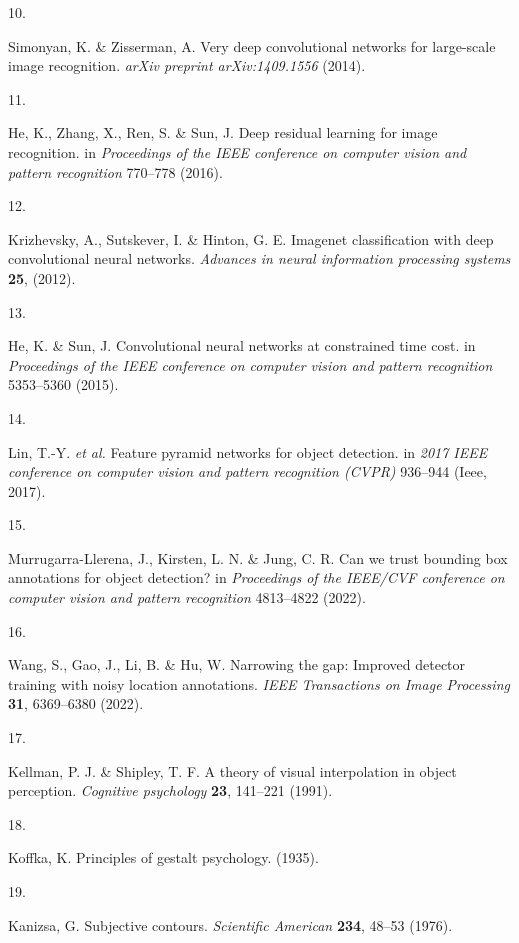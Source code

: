 \documentclass[
  letterpaper,
  DIV=11,
  numbers=noendperiod]{scrartcl}
\newlength{\cslhangindent}
\newlength{\csllabelwidth}
\newenvironment{CSLReferences}[2] %
 {\begin{list}{}{%
  \setlength{\itemindent}{0pt}
  \setlength{\leftmargin}{0pt}
  \setlength{\parsep}{0pt}
  \ifodd #1
   \setlength{\leftmargin}{\cslhangindent}
   \setlength{\itemindent}{-1\cslhangindent}
  \fi
  \setlength{\itemsep}{#2\baselineskip}}}
 {\end{list}}
\newcommand{\CSLLeftMargin}[1]{\parbox[t]{\csllabelwidth}{\strut#1\strut}}
\newcommand{\CSLRightInline}[1]{\parbox[t]{\linewidth - \csllabelwidth}{\strut#1\strut}}
\begin{document}
\begin{CSLReferences}{0}{0}
\CSLLeftMargin{10. }%
\CSLRightInline{Simonyan, K. \& Zisserman, A. Very deep convolutional
networks for large-scale image recognition. \emph{arXiv preprint
arXiv:1409.1556} (2014).}

\CSLLeftMargin{11. }%
\CSLRightInline{He, K., Zhang, X., Ren, S. \& Sun, J. Deep residual
learning for image recognition. in \emph{Proceedings of the IEEE
conference on computer vision and pattern recognition} 770--778 (2016).}

\CSLLeftMargin{12. }%
\CSLRightInline{Krizhevsky, A., Sutskever, I. \& Hinton, G. E. Imagenet
classification with deep convolutional neural networks. \emph{Advances
in neural information processing systems} \textbf{25}, (2012).}

\CSLLeftMargin{13. }%
\CSLRightInline{He, K. \& Sun, J. Convolutional neural networks at
constrained time cost. in \emph{Proceedings of the IEEE conference on
computer vision and pattern recognition} 5353--5360 (2015).}

\CSLLeftMargin{14. }%
\CSLRightInline{Lin, T.-Y. \emph{et al.} Feature pyramid networks for
object detection. in \emph{2017 IEEE conference on computer vision and
pattern recognition (CVPR)} 936--944 (Ieee, 2017).}

\CSLLeftMargin{15. }%
\CSLRightInline{Murrugarra-Llerena, J., Kirsten, L. N. \& Jung, C. R.
Can we trust bounding box annotations for object detection? in
\emph{Proceedings of the IEEE/CVF conference on computer vision and
pattern recognition} 4813--4822 (2022).}

\CSLLeftMargin{16. }%
\CSLRightInline{Wang, S., Gao, J., Li, B. \& Hu, W. Narrowing the gap:
Improved detector training with noisy location annotations. \emph{IEEE
Transactions on Image Processing} \textbf{31}, 6369--6380 (2022).}

\CSLLeftMargin{17. }%
\CSLRightInline{Kellman, P. J. \& Shipley, T. F. A theory of visual
interpolation in object perception. \emph{Cognitive psychology}
\textbf{23}, 141--221 (1991).}

\CSLLeftMargin{18. }%
\CSLRightInline{Koffka, K. Principles of gestalt psychology. (1935).}

\CSLLeftMargin{19. }%
\CSLRightInline{Kanizsa, G. Subjective contours. \emph{Scientific
American} \textbf{234}, 48--53 (1976).}


\end{CSLReferences}
\end{document}
